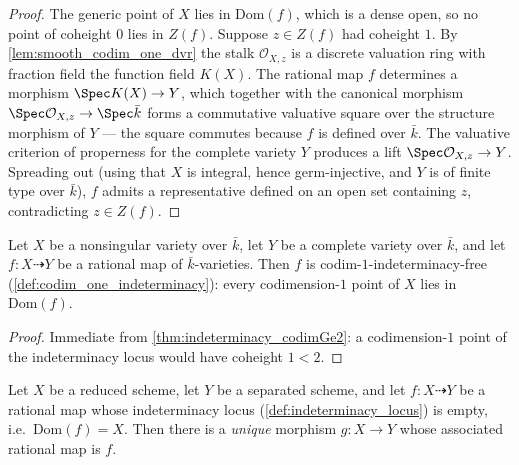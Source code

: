 \begin{proof}
  \leanok
  The generic point of \(X\) lies in \(\mathrm{Dom}(f)\), which is a dense
  open, so no point of coheight \(0\) lies in \(Z(f)\). Suppose \(z \in Z(f)\)
  had coheight \(1\). By \cref{lem:smooth_codim_one_dvr} the stalk
  \(\mathcal O_{X,z}\) is a discrete valuation ring with fraction field the
  function field \(K(X)\). The rational map \(f\) determines a morphism
  \(\Spec K(X) \to Y\), which together with the canonical morphism
  \(\Spec \mathcal O_{X,z} \to \Spec \bar k\) forms a commutative valuative
  square over the structure morphism of \(Y\) --- the square commutes
  because \(f\) is defined over \(\bar k\). The valuative criterion of
  properness for the complete variety \(Y\) produces a lift
  \(\Spec \mathcal O_{X,z} \to Y\). Spreading out (using that \(X\) is
  integral, hence germ-injective, and \(Y\) is of finite type over
  \(\bar k\)), \(f\) admits a representative defined on an open set
  containing \(z\), contradicting \(z \in Z(f)\).
\end{proof}


\begin{corollary}
  \label{cor:codim_one_free}
  Let \(X\) be a nonsingular variety over \(\bar k\), let \(Y\) be a complete variety
  over \(\bar k\), and let \(f \colon X \dashrightarrow Y\) be a rational map of
  \(\bar k\)-varieties. Then \(f\) is codim-\(1\)-indeterminacy-free
  (\cref{def:codim_one_indeterminacy}): every codimension-\(1\) point of \(X\) lies in
  \(\mathrm{Dom}(f)\).
\end{corollary}

\begin{proof}
  \leanok
  Immediate from \cref{thm:indeterminacy_codimGe2}: a codimension-\(1\) point of the
  indeterminacy locus would have coheight \(1 < 2\).
\end{proof}

\begin{theorem}
  \label{thm:codim_one_extension}
  Let \(X\) be a reduced scheme, let \(Y\) be a separated scheme, and let
  \(f \colon X \dashrightarrow Y\) be a rational map whose indeterminacy locus
  (\cref{def:indeterminacy_locus}) is empty, i.e.\ \(\mathrm{Dom}(f) = X\). Then there
  is a \emph{unique} morphism \(g \colon X \to Y\) whose associated rational map is
  \(f\).
\end{theorem}

